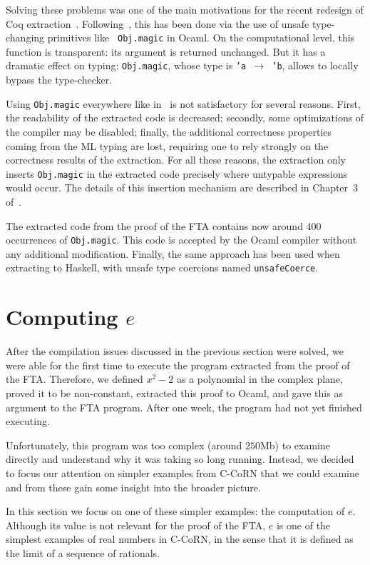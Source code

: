 \documentclass{entcs}
\begin{document}
Solving these problems was one of the main motivations for the recent
redesign of Coq extraction~\cite{let:04}. Following~\cite{pot:01}, this has 
been done via the use of unsafe type-changing primitives like {\tt
Obj.magic} in Ocaml. On the computational level, this function is
transparent: its argument is returned unchanged. But it has a dramatic
effect on typing: {\tt Obj.magic}, whose type is {\tt 'a
$\rightarrow$ 'b}, allows to locally bypass the
type-checker.

Using {\tt Obj.magic} everywhere like in~\cite{pot:01} is not satisfactory 
for several reasons. First, the readability of the extracted code is
decreased; secondly, some optimizations of the compiler may be disabled;
finally, the additional correctness properties coming from the ML
typing are lost, requiring one to rely strongly on the correctness
results of the extraction. For all these reasons, the extraction only
inserts {\tt Obj.magic} in the extracted code precisely where
untypable expressions would occur.
The details of this insertion mechanism are described in Chapter~3
of~\cite{let:04}.

The extracted code from the proof of the FTA contains now around 400
occurrences of {\tt Obj.magic}.
This code is accepted by the Ocaml compiler without any additional
modification. Finally, the same approach has been used when extracting 
to Haskell, with unsafe type coercions named {\tt unsafeCoerce}.


\section{\texorpdfstring{Computing $e$}{Computing e}}\label{e}

After the compilation issues discussed in the previous section were
solved, we were able for the first time to execute the program extracted
from the proof of the FTA.  Therefore, we defined $x^2-2$ as a polynomial
in the complex plane, proved it to be non-constant, extracted this proof
to Ocaml, and gave this as argument to the FTA program.
After one week, the program had not yet finished executing.

Unfortunately, this program was too complex (around $250$Mb) to examine
directly and
understand why it was taking so long running.  Instead, we decided to
focus our attention on simpler examples from C-CoRN that we could examine
and from these gain some insight into the broader picture.

In this section we focus on one of these simpler examples: the computation
of $e$.  Although its value is not relevant for the proof of the
FTA, $e$ is one of the simplest examples of real numbers in C-CoRN, in
the sense that it is defined as the limit of a sequence of rationals.
\end{document}
